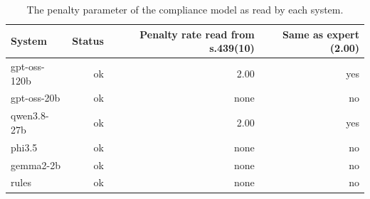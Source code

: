 \begin{table}[t]
\centering\small
\caption{The penalty parameter of the compliance model as read by each system.}
\label{tab:behaviour_systems}
\begin{tabular}{lrrr}
\toprule
System & Status & Penalty rate read from s.439(10) & Same as expert (2.00) \\
\midrule
gpt-oss-120b & ok & 2.00 & yes \\
gpt-oss-20b & ok & none & no \\
qwen3.8-27b & ok & 2.00 & yes \\
phi3.5 & ok & none & no \\
gemma2-2b & ok & none & no \\
rules & ok & none & no \\
\bottomrule
\end{tabular}
\end{table}
